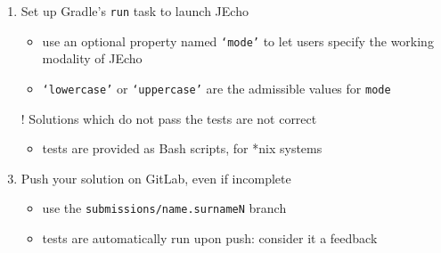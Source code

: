 \documentclass[presentation]{beamer}\mode<presentation>{\usetheme{AMSBolognaFC}}
\begin{document}
\begin{frame}[allowframebreaks]
\begin{enumerate}
		\medskip

		\item Set up Gradle's \texttt{run} task to launch JEcho
		\begin{itemize}
			\item use an optional property named \texttt{`mode'} to let users specify the working modality of JEcho
			\item \texttt{`lowercase'} or \texttt{`uppercase'} are the admissible values for \texttt{mode}
		\end{itemize}

		\medskip

		\item[!] Solutions which do not pass the tests are not correct
		\begin{itemize}
			\item tests are provided as Bash scripts, for *nix systems
		\end{itemize}

		\medskip

		\item Push your solution on GitLab, \alert{even if incomplete}
		\begin{itemize}
			\item use the \texttt{submissions/\alert{name.surnameN}} branch
			\item tests are automatically run upon push: consider it a feedback
		\end{itemize}

	\end{enumerate}

\end{frame}

\section*{}
\frame{\titlepage}

\section*{\bibname}
\end{document}
